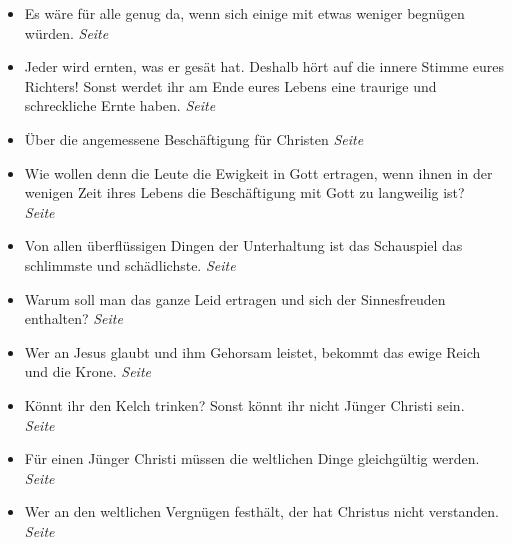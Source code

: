 \begin{itemize}
\begin{itemize}
 \item Es wäre für alle genug da, wenn sich einige mit etwas weniger begnügen
würden.
 \dotfill \textit{Seite~\pageref{ref:15_02_genug_fuer_alle}}\\

 \item Jeder wird ernten, was er gesät hat. Deshalb hört auf die innere Stimme
eures Richters! Sonst werdet ihr am Ende eures Lebens eine traurige und
schreckliche Ernte haben.
 \dotfill \textit{Seite~\pageref{ref:15_04_innere_stimme}}\\

 \item Über die angemessene Beschäftigung für Christen
 \dotfill \textit{Seite~\pageref{ref:15_05_freizeitbeschaeftigung}}\\

 \item Wie wollen denn die Leute die Ewigkeit in Gott ertragen, wenn ihnen in der
wenigen Zeit ihres Lebens die Beschäftigung mit Gott zu langweilig ist?
 \dotfill \textit{Seite~\pageref{ref:15_06_langeweile}}\\

 \item Von allen überflüssigen Dingen der Unterhaltung ist das Schauspiel das schlimmste und schädlichste.
 \dotfill \textit{Seite~\pageref{ref:15_08_schauspiel}}\\

 \item Warum soll man das ganze Leid ertragen und sich der Sinnesfreuden
enthalten?
 \dotfill \textit{Seite~\pageref{ref:16_01_warum}}\\

 \item Wer an Jesus glaubt und ihm Gehorsam leistet, bekommt das ewige Reich und
die Krone.
 \dotfill \textit{Seite~\pageref{ref:16_01_warum_2}}\\

 \item Könnt ihr den Kelch trinken? Sonst könnt ihr nicht Jünger Christi sein.
 \dotfill \textit{Seite~\pageref{ref:16_03_kelch_tringen}}\\

 \item Für einen Jünger Christi müssen die weltlichen Dinge gleichgültig werden.
 \dotfill \textit{Seite~\pageref{ref:16_05_weltliches}}\\

 \item Wer an den weltlichen Vergnügen festhält, der hat Christus nicht verstanden.
 \dotfill \textit{Seite~\pageref{ref:16_05_weltliches_2}}\\


\end{itemize}
\end{itemize}

